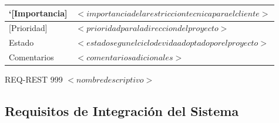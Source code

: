 \begin{Artefacto}[H]
\begin{tabular}{|p{3cm}|p{10cm}|}
        \hline          
           \cellcolor{gray30}`[Importancia]	& $<importancia de la restriccion tecnica para el cliente>$  \\
         \hline
         \cellcolor{gray30}  [Prioridad] &  	$<prioridad para la direccion del proyecto>$\\
         \hline
         \cellcolor{gray30}  Estado	&$<estado segun el ciclo de vida adoptado por el proyecto>$\\   
        \hline       
         \cellcolor{gray30}  Comentarios	&$<comentarios adicionales >$\\   
        \hline
  
    \end{tabular}
\caption{REQ-REST 999	$<nombre descriptivo>$ }
  \end{Artefacto}



 


\subsection{Requisitos de Integración del Sistema}

 



